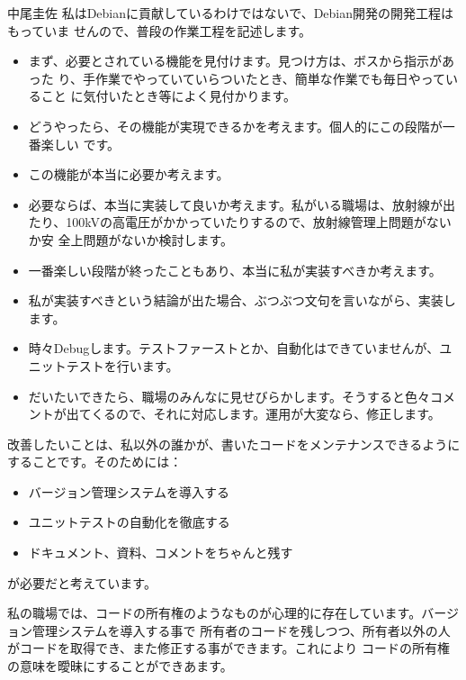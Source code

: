 \begin{prework}{中尾圭佐}
私はDebianに貢献しているわけではないで、Debian開発の開発工程はもっていま
 せんので、普段の作業工程を記述します。

\begin{itemize}
 \item まず、必要とされている機能を見付けます。見つけ方は、ボスから指示があった
 り、手作業でやっていていらついたとき、簡単な作業でも毎日やっていること
 に気付いたとき等によく見付かります。

 \item どうやったら、その機能が実現できるかを考えます。個人的にこの段階が一番楽しい
 です。

 \item この機能が本当に必要か考えます。

 \item 必要ならば、本当に実装して良いか考えます。私がいる職場は、放射線が出
 たり、100kVの高電圧がかかっていたりするので、放射線管理上問題がないか安
 全上問題がないか検討します。

 \item 一番楽しい段階が終ったこともあり、本当に私が実装すべきか考えます。

 \item 私が実装すべきという結論が出た場合、ぶつぶつ文句を言いながら、実装し
 ます。

 \item 時々Debugします。テストファーストとか、自動化はできていませんが、ユニットテストを行います。

 \item だいたいできたら、職場のみんなに見せびらかします。そうすると色々コメ
 ントが出てくるので、それに対応します。運用が大変なら、修正します。
\end{itemize}


改善したいことは、私以外の誰かが、書いたコードをメンテナンスできるように
することです。そのためには：
\begin{itemize}
 \item バージョン管理システムを導入する
 \item ユニットテストの自動化を徹底する
 \item ドキュメント、資料、コメントをちゃんと残す
\end{itemize}
が必要だと考えています。

私の職場では、コードの所有権のようなものが心理的に存在しています。バージョン管理システムを導入する事で
所有者のコードを残しつつ、所有者以外の人がコードを取得でき、また修正する事ができます。これにより
コードの所有権の意味を曖昧にすることができあます。


\end{prework}
